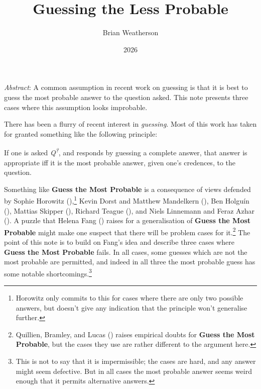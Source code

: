 \documentclass[
  11pt,
  letterpaper,
  DIV=11,
  numbers=noendperiod,
  twoside]{scrartcl}
\title{Guessing the Less Probable}
\author{Brian Weatherson}
\date{2026}
\providecommand{\tightlist}{%
  \setlength{\itemsep}{0pt}\setlength{\parskip}{0pt}}
\renewenvironment{abstract}
 {\vspace{-1.25cm}
 \quotation\small\noindent\emph{Abstract}:}
 {\endquotation}
\renewenvironment{abstract}
 {\quotation\small\noindent\emph{Abstract}:}
 {\endquotation\vspace{-0.02cm}}
\begin{document}
\maketitle
\begin{abstract}
A common assumption in recent work on guessing is that it is best to
guess the most probable answer to the question asked. This note presents
three cases where this assumption looks improbable.
\end{abstract}


There has been a flurry of recent interest in \emph{guessing}. Most of
this work has taken for granted something like the following principle:

\begin{description}
\tightlist
\item[Guess the Most Probable]
If one is asked \emph{Q\textsuperscript{?}}, and responds by guessing a
complete answer, that answer is appropriate iff it is the most probable
answer, given one's credences, to the question.
\end{description}

Something like \textbf{Guess the Most Probable} is a consequence of
views defended by Sophie Horowitz
(),\footnote{Horowitz only commits to
  this for cases where there are only two possible answers, but doesn't
  give any indication that the principle won't generalise further.}
Kevin Dorst and Matthew Mandelkern
(), Ben Holguín
(), Mattias Skipper
(), Richard Teague
(), and Niels Linnemann and Feraz Azhar
(). A puzzle that Helena Fang
() raises for a generalisation of
\textbf{Guess the Most Probable} might make one suspect that there will
be problem cases for it.\footnote{Quillien, Bramley, and Lucas
  () raises empirical doubts for
  \textbf{Guess the Most Probable}, but the cases they use are rather
  different to the argument here.} The point of this note is to build on
Fang's idea and describe three cases where \textbf{Guess the Most
Probable} fails. In all cases, some guesses which are not the most
probable are permitted, and indeed in all three the most probable guess
has some notable shortcomings.\footnote{This is not to say that it is
  impermissible; the cases are hard, and any answer might seem
  defective. But in all cases the most probable answer seems weird
  enough that it permits alternative answers.}
\end{document}
